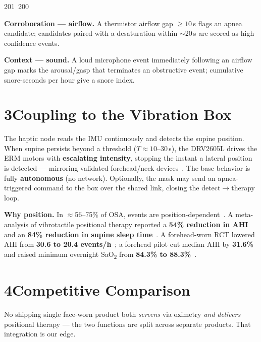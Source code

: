201~200~\documentclass[10pt]{article}
\begin{document}
\textbf{Corroboration --- airflow.} A thermistor airflow gap $\geq 10$\,s flags an apnea candidate;
candidates paired with a desaturation within $\sim$20\,s are scored as high-confidence events.

\textbf{Context --- sound.} A loud microphone event immediately following an airflow gap marks the
arousal/gasp that terminates an obstructive event; cumulative snore-seconds per hour give a snore index.

\section*{3\quad Coupling to the Vibration Box}
The haptic node reads the IMU continuously and detects the supine position. When supine persists
beyond a threshold ($T \approx 10$--$30$\,s), the DRV2605L drives the ERM motors with
\textbf{escalating intensity}, stopping the instant a lateral position is detected --- mirroring
validated forehead/neck devices~\cite{forehead-rct,positional-pilot}. The base behavior is fully
\textbf{autonomous} (no network). Optionally, the mask may send an apnea-triggered command to the box
over the shared link, closing the detect$\rightarrow$therapy loop.

\textbf{Why position.} In $\approx$56--75\% of OSA, events are position-dependent~\cite{pt-meta}. A
meta-analysis of vibrotactile positional therapy reported a \textbf{54\% reduction in AHI} and an
\textbf{84\% reduction in supine sleep time}~\cite{pt-meta}. A forehead-worn RCT lowered AHI from
\textbf{30.6 to 20.4 events/h}~\cite{forehead-rct}; a forehead pilot cut median AHI by
\textbf{31.6\%} and raised minimum overnight SaO\textsubscript{2} from \textbf{84.3\% to
88.3\%}~\cite{positional-pilot}.

\section*{4\quad Competitive Comparison}
No shipping single face-worn product both \emph{screens} via oximetry \emph{and} \emph{delivers}
positional therapy --- the two functions are split across separate products. That integration is our edge.
\end{document}

